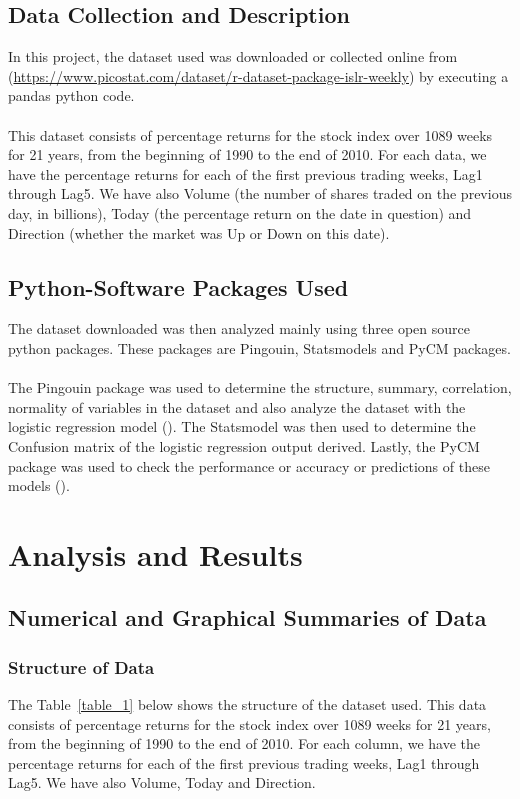 \documentclass[12pt]{article}
\begin{document}
\subsection{Data Collection and Description}
In this project, the dataset used was downloaded or collected online from (\url{https://www.picostat.com/dataset/r-dataset-package-islr-weekly}) by executing a pandas python code. \\\\
This dataset consists of percentage returns for the stock index over 1089 weeks for 21 years, from the beginning of 1990 to the end of 2010.  For each data,  we have the percentage returns for each of the  first previous trading weeks, Lag1 through Lag5.  We have also Volume (the number of shares traded on the previous day, in billions), Today (the percentage return on the date in question) and Direction (whether the market was Up or Down on this date). 

\subsection{Python-Software Packages Used}
The dataset downloaded was then analyzed mainly using three open source python packages. These packages are Pingouin, Statsmodels and PyCM packages. \\\\
The Pingouin package was used to determine the structure, summary, correlation, normality of variables in the dataset and also analyze the dataset with the logistic regression model (\cite{ref-software}). The Statsmodel was then used to determine the Confusion matrix of the logistic regression output derived. Lastly, the PyCM package was used to check the performance or accuracy or predictions of these models (\cite{ref-softwaree}).


\section{Analysis and Results}
\subsection{Numerical and Graphical Summaries of Data}

\subsubsection{Structure of Data}
The Table~\ref{table_1} below shows the structure of the dataset used. This data consists of percentage returns for the stock index over 1089 weeks for 21 years, from the beginning of 1990 to the end of 2010. For each column, we have the percentage returns for each of the first previous trading weeks, Lag1 through Lag5. We have also Volume, Today and Direction. 
\end{document}
